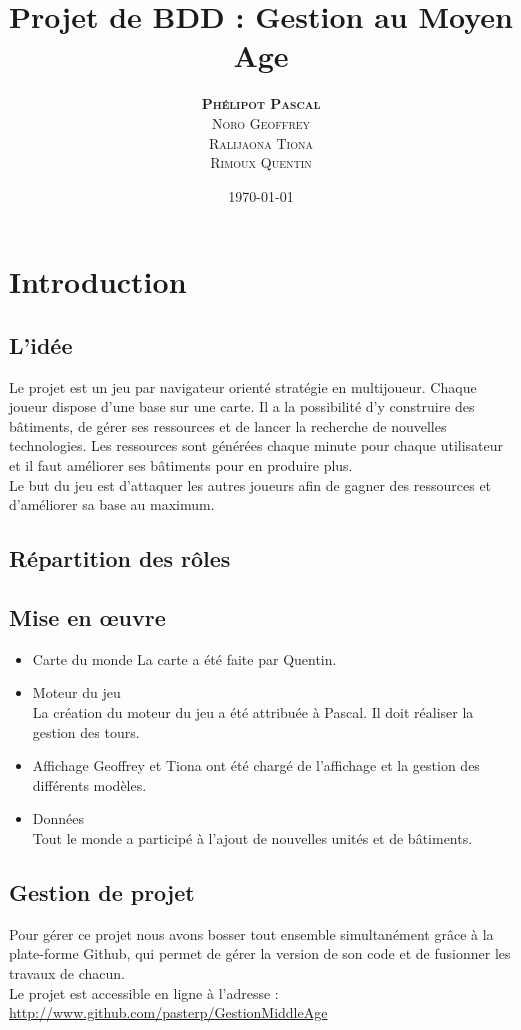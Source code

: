 \documentclass[11pt,a4paper]{article}
\author{\textsc{\textbf{Phélipot Pascal}}\\\textsc{Noro Geoffrey}\\\textsc{Ralijaona Tiona}\\\textsc{Rimoux Quentin}}
\title{Projet de BDD : Gestion au Moyen Age}
\date\today
\begin{document}
\maketitle
\pagestyle{plain}
\newpage{}
\tableofcontents

\newpage{}
\section{Introduction}
\subsection{L'idée}
Le projet est un jeu par navigateur orienté stratégie en multijoueur. 
Chaque joueur dispose d'une base sur une carte. Il a la possibilité d'y construire des bâtiments, de gérer ses ressources et de lancer la recherche de nouvelles technologies.
Les ressources sont générées chaque minute pour chaque utilisateur et il faut améliorer ses bâtiments pour en produire plus. \\
Le but du jeu est d'attaquer les autres joueurs afin de gagner des ressources et d'améliorer sa base au maximum. \\


\subsection{Répartition des rôles}
\subsection{Mise en œuvre}
\begin{itemize}
	\item Carte du monde 
	La carte a été faite par Quentin.
	\item Moteur du jeu \\
	La création du moteur du jeu a été attribuée à Pascal. Il doit réaliser la gestion des tours.
	\item Affichage
	Geoffrey et Tiona ont été chargé de l'affichage et la gestion des différents modèles. 
	\item Données \\
	Tout le monde a participé à l'ajout de nouvelles unités et de bâtiments.
\end{itemize}
\subsection{Gestion de projet}
Pour gérer ce projet nous avons bosser tout ensemble simultanément grâce à la plate-forme Github, qui permet de gérer la version de son code et de fusionner les travaux de chacun.\\
Le projet est accessible en ligne à l'adresse :  \url{http://www.github.com/pasterp/GestionMiddleAge}
\end{document}
